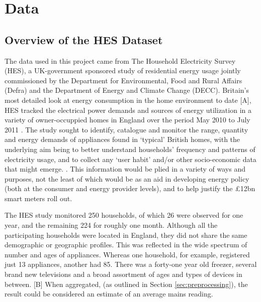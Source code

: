 \chapter{Data}


\section{Overview of the HES Dataset}
The data used in this project came from The Household Electricity Survey (HES), a UK-government sponsored study of residential energy usage jointly commissioned by the Department for Environmental, Food and Rural Affairs (Defra) and the Department of Energy and Climate Change (DECC).  Britain's most detailed look at energy consumption in the home environment to date [A], HES tracked the electrical power demands and sources of energy utilization in a variety of owner-occuppied homes in England over the period May 2010 to July 2011 \cite{HES}. The study sought to identify, catalogue and monitor the range, quantity and energy demands of appliances found in `typical' British homes, with the underlying aim being to better understand households' frequency and patterns of electricity usage, and to collect any `user habit' and/or other socio-economic data that might emerge. \cite{early_findings}.  This information would be plied in a variety of ways and purposes, not the least of which would be as an aid in developing energy policy  (both at the consumer and energy provider levels), and to help justify the £12bn smart meters roll out.   

The HES study monitored 250 households, of which 26 were observed for one year, and the remaining 224 for roughly one month. Although all the participating households were located in England, they did not share the same demographic or geographic profiles.   This was reflected in the wide spectrum of number and ages of appliances.  Whereas one household, for example, registered just 13 appliances, another had 85.  There was a forty-one year old freezer, several brand new televisions and a broad assortment of ages and types of devices in between. [B]  When aggregated, (as outlined in Section \ref{sec:preprocessing}), the result could be considered an estimate of an average mains reading. 

